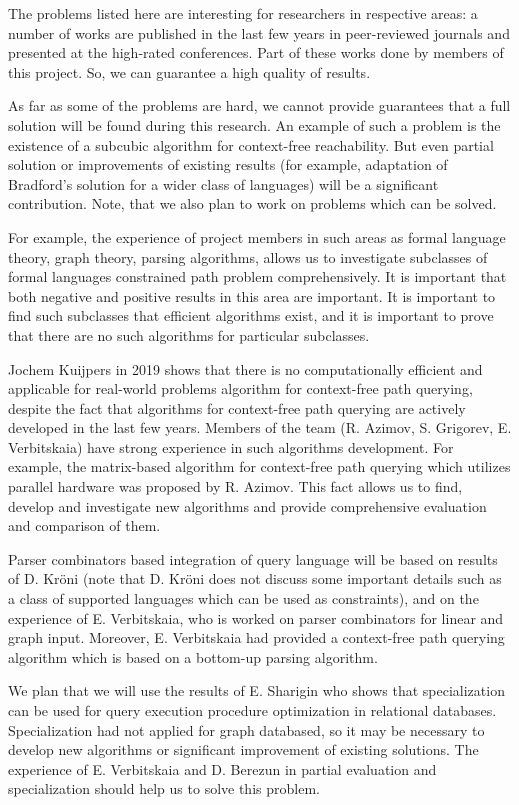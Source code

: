\documentclass[12pt]{article}  %
\theoremstyle{remark}
\begin{document}
The problems listed here are interesting for researchers in respective areas: a number of works are published in the last few years in peer-reviewed journals and presented at the high-rated conferences. Part of these works done by members of this project. So, we can guarantee a high quality of results.

As far as some of the problems are hard, we cannot provide guarantees that a full solution will be found during this research. An example of such a problem is the existence of a subcubic algorithm for context-free reachability. But even partial solution or improvements of existing results (for example, adaptation of Bradford's solution for a wider class of languages) will be a significant contribution. Note, that we also plan to work on problems which can be solved.

For example, the experience of project members in such areas as formal language theory, graph theory, parsing algorithms, allows us to investigate subclasses of formal languages constrained path problem comprehensively. It is important that both negative and positive results in this area are important. It is important to find such subclasses that efficient algorithms exist, and it is important to prove that there are no such algorithms for particular subclasses.

Jochem Kuijpers in 2019 shows that there is no computationally efficient and applicable for real-world problems algorithm for context-free path querying, despite the fact that algorithms for context-free path querying are actively developed in the last few years.
Members of the team (R. Azimov, S. Grigorev, E. Verbitskaia) have strong experience in such algorithms development. For example, the matrix-based algorithm for context-free path querying which utilizes parallel hardware was proposed by R. Azimov. This fact allows us to find, develop and investigate new algorithms and provide comprehensive evaluation and comparison of them.

Parser combinators based integration of query language will be based on results of D. Kröni (note that D. Kröni does not discuss some important details such as a class of supported languages which can be used as constraints), and on the experience of E. Verbitskaia, who is worked on parser combinators for linear and graph input. Moreover, E. Verbitskaia had provided a context-free path querying algorithm which is based on a bottom-up parsing algorithm.

We plan that we will use the results of E. Sharigin who shows that specialization can be used for query execution procedure optimization in relational databases. Specialization had not applied for graph databased, so it may be necessary to develop new algorithms or significant improvement of existing solutions. The experience of E. Verbitskaia and D. Berezun in partial evaluation and specialization should help us to solve this problem.
\end{document}
